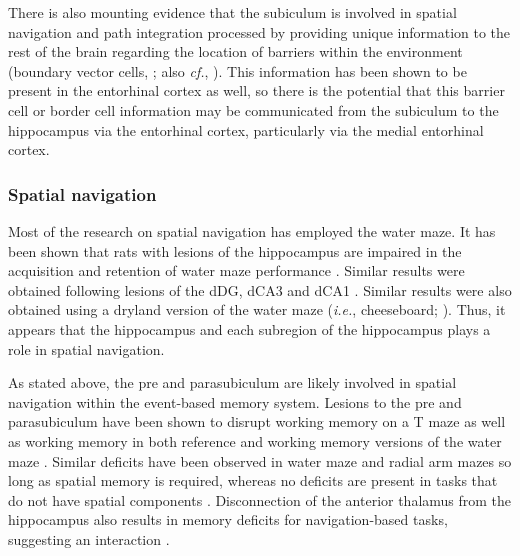 \documentclass[doc, longtable]{apa6}
\begin{document}
There is also mounting evidence that the subiculum is involved in spatial navigation and path integration processed by providing unique information to the rest of the brain regarding the location of barriers within the environment (boundary vector cells, \cite{Barry2006a, Lever2009a, Solstad2008a, Stewart2014a}; also \textit{cf.}, \cite{Sharp1999a, Sharp1999, Sharp1999c, Sharp2005a, Sharp2006b}). This information has been shown to be present in the entorhinal cortex as well, so there is the potential that this barrier cell or border cell information may be communicated from the subiculum to the hippocampus via the entorhinal cortex, particularly via the medial entorhinal cortex.

\subsubsection{Spatial navigation}
Most of the research on spatial navigation has employed the water maze. It has been shown that rats with lesions of the hippocampus are impaired in the acquisition and retention of water maze performance \parencite{Eichenbaum1990a, DiMattia1988a, Morris1982a}. Similar results were obtained following lesions of the dDG, dCA3 and dCA1 \parencite{Jeltsch2001a, Stubley-Weatherly1996a}. Similar results were also obtained using a dryland version of the water maze (\textit{i.e.}, cheeseboard; \cite{Kesner1991a}). Thus, it appears that the hippocampus and each subregion of the hippocampus plays a role in spatial navigation.
	
As stated above, the pre and parasubiculum are likely involved in spatial navigation within the event-based memory system. Lesions to the pre and parasubiculum have been shown to disrupt working memory on a T maze as well as working memory in both reference and working memory versions of the water maze \parencite{Liu2001a}. Similar deficits have been observed in water maze and radial arm mazes so long as spatial memory is required, whereas no deficits are present in tasks that do not have spatial components \parencite{Taube1992a}. Disconnection of the anterior thalamus from the hippocampus also results in memory deficits for navigation-based tasks, suggesting an interaction \parencite{Warburton2001a}.
\end{document}
